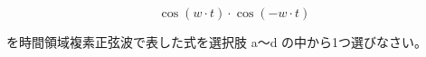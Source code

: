 \[
\cos(w\cdot t) \cdot \cos(-w\cdot t)
\]

\bigskip
\noindent を時間領域複素正弦波で表した式を選択肢 a〜d の中から1つ選びなさい。
